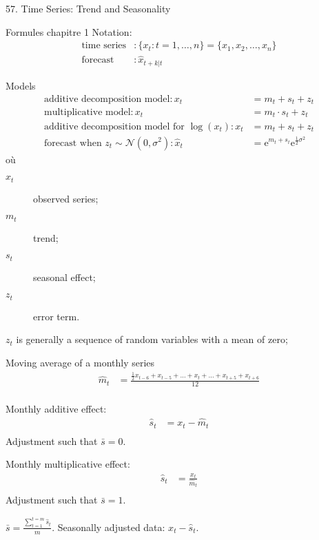 \documentclass[12pt, titlepage, french]{report}
\begin{document}
\begin{CHPT_SUMM_AUTO}[label = {L.-57}]{57. Time Series: Trend and Seasonality}
\begin{FORMULA_SUMM}{Formules chapitre 1}
Notation:
	\begin{align*}
	\text{time series}&:	
		\{x_{t} : t = 1, \dots, n\} 
	= 	\{x_{1}, x_{2}, \dots, x_{n}\}	\\
	\text{forecast}	&:	
		\hat{x}_{t + k | t}
	\end{align*}
	
Models
	\begin{align*}
	\text{additive decomposition model}	:	
	x_{t}	
	&=	m_{t} + s_{t} + z_{t}		\\
	\text{multiplicative model}	:	
	x_{t}	
	&=	m_{t} \cdot s_{t} + z_{t}		\\
	\text{additive decomposition model for }\log(x_{t})	:	
	x_{t}	
	&=	m_{t} + s_{t} + z_{t}	\\
	\text{forecast when }z_{t} \sim \mathcal{N}(0, \sigma^{2})	:
	\hat{x}_{t}	
	&=	\text{e}^{m_{t} + s_{t}}\text{e}^{\frac{1}{2}\sigma^{2}}
	\end{align*}
où
	\begin{multicols*}{2}
	\begin{description}
	\item[$x_{t}$]	observed series;
	\item[$m_{t}$]	trend;
	\item[$s_{t}$]	seasonal effect;
	\item[$z_{t}$]	error term.
	\end{description}
	\end{multicols*}
$z_{t}$ is generally a sequence of random variables with a mean of zero;

Moving average of a monthly series
	\setlength{\mathindent}{-1cm}
	\begin{align*}
	\hat{m}_{t}
	&=	\frac{\frac{1}{2} x_{t - 6} + x_{t - 5} + \dots + x_{t} + \dots + x_{t + 5} + x_{t + 6}}{12}	\\
	\end{align*}
	\setlength{\mathindent}{1cm}

	
Monthly additive effect:
	\begin{align*}
	\hat{s}_{t} 
	&= 	x_{t} - \hat{m}_{t}	\\
	\end{align*}
Adjustment such that $\bar{s} = 0$.
	
Monthly multiplicative effect:
	\begin{align*}
	\hat{s}_{t} 
	&= 	\frac{x_{t}}{\hat{m}_{t}}	\\
	\end{align*}
Adjustment such that $\bar{s} = 1$.


$\bar{s} = \frac{\sum_{t = 1}^{t = m}\hat{s}_{t}}{m}$.
Seasonally adjusted data: $x_{t} - \hat{s}_{t}$.
\end{FORMULA_SUMM}
\tcbline
\end{CHPT_SUMM_AUTO}
\end{document}
